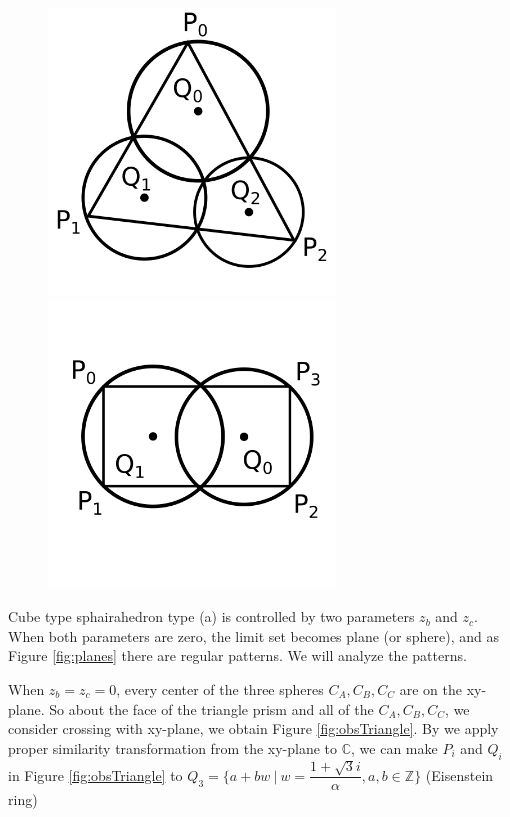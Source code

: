 \documentclass[suppldata, dvipdfmx]{interact}
\theoremstyle{plain}%
\theoremstyle{definition}
\theoremstyle{remark}
\theoremstyle{problemstyle}
\begin{document}
\begin{figure}[h!tbp]
 \begin{minipage}[t]{0.5\textwidth}
 \centering
 \includegraphics[width=3in,
 keepaspectratio]{./img/Observation/triangle.png}
 \caption{}
 \label{fig:obsTriangle}
 \end{minipage}
 \hspace*{\fill}
 \begin{minipage}[t]{0.5\textwidth}
  \centering
  \includegraphics[width=3in,
  keepaspectratio]{./img/Observation/rect.png}
  \caption{}
  \label{fig:obsRect}
 \end{minipage}
 \hspace*{\fill}
\end{figure}

Cube type sphairahedron type (a) is controlled by two parameters $z_b$
and $z_c$.
When both parameters are zero, the limit set becomes plane (or
sphere), and as Figure \ref{fig:planes} there are
regular patterns. We will analyze the patterns.

When $z_b = z_c = 0$, every center of the three spheres $C_A, C_B, C_C$
are on the xy-plane. So about the face of the triangle prism and all of the
$C_A, C_B, C_C$, we consider crossing with xy-plane, we obtain Figure
\ref{fig:obsTriangle}.
By we apply proper similarity transformation from the xy-plane to
$\mathbb{C}$, we can make $P_i$ and $Q_i$ in
Figure \ref{fig:obsTriangle} to
$Q_3 = \{ a+bw~|~w=\dfrac{1 + \sqrt{3}i}{\alpha}, a, b \in \mathbb{Z}\}$
(Eisenstein ring)
\end{document}
